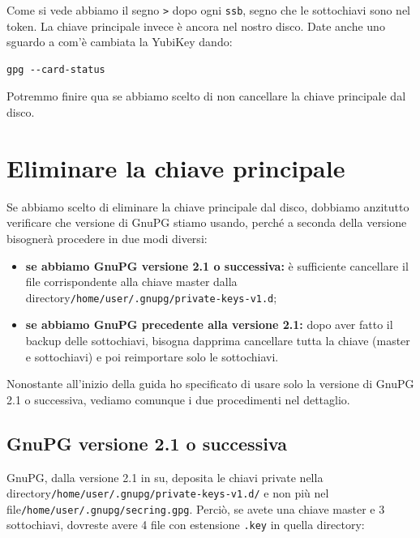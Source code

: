 \documentclass[a4paper,10pt]{article}
\begin{document}
Come si vede abbiamo il segno \texttt{>} dopo ogni \texttt{ssb}, segno che le sottochiavi sono nel token. La chiave principale invece è ancora nel nostro disco. Date anche uno sguardo a com'è cambiata la YubiKey dando:

\begin{lstlisting}
gpg --card-status
\end{lstlisting}

Potremmo finire qua se abbiamo scelto di non cancellare la chiave principale dal disco.

\section{Eliminare la chiave principale}

Se abbiamo scelto di eliminare la chiave principale dal disco, dobbiamo anzitutto verificare che versione di GnuPG stiamo usando, perché a seconda della versione bisognerà procedere in due modi diversi:

\begin{itemize}
   \item \textbf{se abbiamo GnuPG versione 2.1 o successiva:} è sufficiente cancellare il file corrispondente alla chiave master dalla directory\newline \texttt{/home/user/.gnupg/private-keys-v1.d};
   \item \textbf{se abbiamo GnuPG precedente alla versione 2.1:} dopo aver fatto il backup delle sottochiavi, bisogna dapprima cancellare tutta la chiave (master e sottochiavi) e poi reimportare solo le sottochiavi.
\end{itemize}

Nonostante all'inizio della guida ho specificato di usare solo la versione di GnuPG 2.1 o successiva, vediamo comunque i due procedimenti nel dettaglio.

\subsection{GnuPG versione 2.1 o successiva}

GnuPG, dalla versione 2.1 in su, deposita le chiavi private nella directory\newline \texttt{/home/user/.gnupg/private-keys-v1.d/} e non più nel file\newline \texttt{/home/user/.gnupg/secring.gpg}. Perciò, se avete una chiave master e 3 sottochiavi, dovreste avere 4 file con estensione \texttt{.key} in quella directory:
\end{document}
